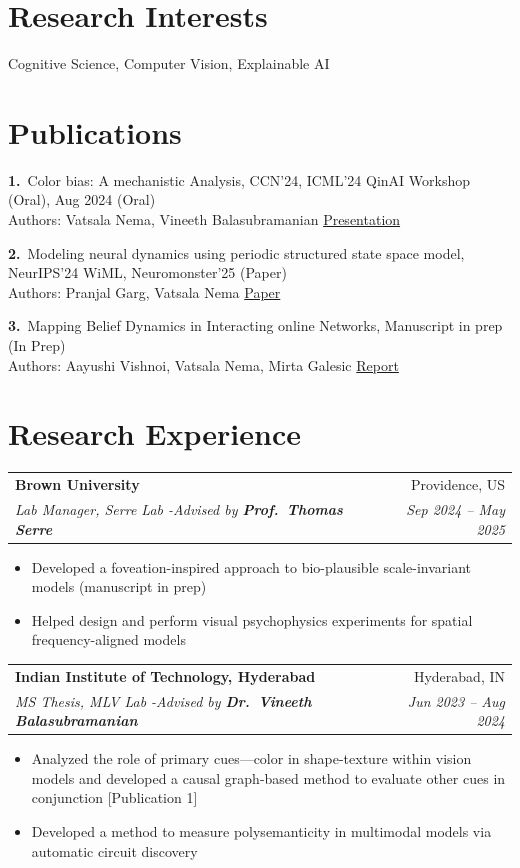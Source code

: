 \documentclass[10pt, letterpaper]{article}
\makeatletter
\newcommand{\entry}[4]{%
  \vspace{4pt}
  \begin{tabularx}{\linewidth}{@{}X r@{}}
    \small\textbf{#2} & \small #3 \\
    \small\textit{#1} & \small\textit{#4} \\
  \end{tabularx}%
}
\newcommand{\pubitem}[5]{%
  \vspace{3pt}\noindent
  \textbf{#1.}~#2, #4 (#5)\\
  \small Authors: #3
  \vspace{3pt}%
}
\makeatother
\begin{document}
\section{Research Interests}

\noindent Cognitive Science, Computer Vision, Explainable AI

\section{Publications}

\pubitem{1}
  {Color bias: A mechanistic Analysis}
  {Vatsala Nema, Vineeth Balasubramanian \href{https://drive.google.com/file/d/1amkoCZ1nb8eMkr0ds2knJ-0pEdPLBn-e/view?usp=sharing}{Presentation}}
  {CCN'24, ICML'24 QinAI Workshop (Oral), Aug 2024}
  {Oral}

\pubitem{2}
  {Modeling neural dynamics using periodic structured state space model}
  {Pranjal Garg, Vatsala Nema \href{https://drive.google.com/file/d/1amkoCZ1nb8eMkr0ds2knJ-0pEdPLBn-e/view?usp=sharing}{Paper}}
  {NeurIPS'24 WiML, Neuromonster'25}
  {Paper}

\pubitem{3}
  {Mapping Belief Dynamics in Interacting online Networks}
  {Aayushi Vishnoi, Vatsala Nema, Mirta Galesic \href{https://drive.google.com/file/d/1amkoCZ1nb8eMkr0ds2knJ-0pEdPLBn-e/view?usp=sharing}{Report}}
  {Manuscript in prep}
  {In Prep}

\section{Research Experience}

\entry
  {Lab Manager, Serre Lab \normalfont -Advised by \textbf{Prof.\ Thomas Serre}}
  {Brown University}
  {Providence, US}
  {Sep 2024 – May 2025}
\begin{itemize}
  \item Developed a foveation-inspired approach to bio-plausible scale-invariant
        models (manuscript in prep)
  \item Helped design and perform visual psychophysics experiments for
        spatial frequency-aligned models
\end{itemize}

\entry
  {MS Thesis, MLV Lab \normalfont -Advised by \textbf{Dr.\ Vineeth Balasubramanian}}
  {Indian Institute of Technology, Hyderabad}
  {Hyderabad, IN}
  {Jun 2023 – Aug 2024}
\begin{itemize}
  \item Analyzed the role of primary cues—color in shape-texture within vision
        models and developed a causal graph-based method to evaluate other cues
        in conjunction [Publication 1]
  \item Developed a method to measure polysemanticity in multimodal models via
        automatic circuit discovery
\end{itemize}
\end{document}
